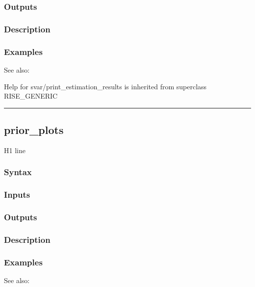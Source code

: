 \documentclass[letterpaper,10pt,english]{sphinxmanual}
\begin{document}
\subsubsection{Outputs}
\label{classes/models/@svar/svar:id89}

\subsubsection{Description}
\label{classes/models/@svar/svar:id90}

\subsubsection{Examples}
\label{classes/models/@svar/svar:id91}
See also:

Help for svar/print\_estimation\_results is inherited from superclass RISE\_GENERIC


\bigskip\hrule{}\bigskip



\subsection{prior\_plots}
\label{classes/models/@svar/svar:id92}\label{classes/models/@svar/svar:prior-plots}
H1 line


\subsubsection{Syntax}
\label{classes/models/@svar/svar:id93}

\subsubsection{Inputs}
\label{classes/models/@svar/svar:id94}

\subsubsection{Outputs}
\label{classes/models/@svar/svar:id95}

\subsubsection{Description}
\label{classes/models/@svar/svar:id96}

\subsubsection{Examples}
\label{classes/models/@svar/svar:id97}
See also:
\end{document}
